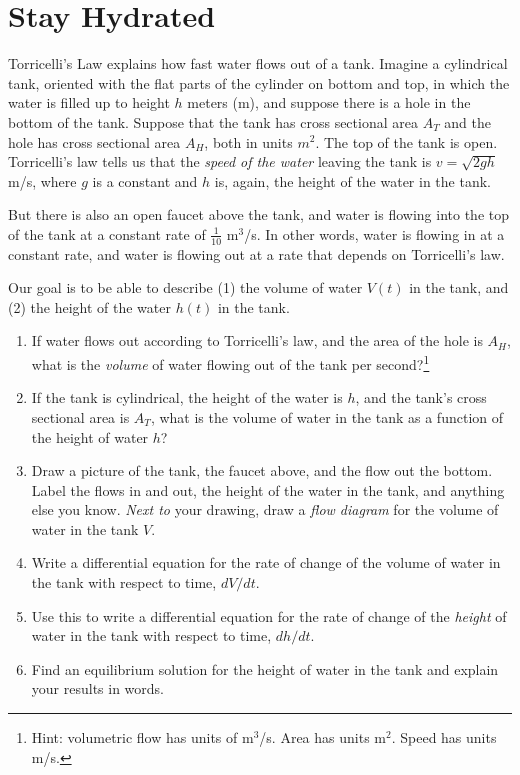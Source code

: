 \documentclass[11pt,onecolumn,superscriptaddress,notitlepage]{article}
\begin{document}
\section*{Stay Hydrated} 
Torricelli's Law explains how fast water flows out of a tank. Imagine a cylindrical tank, oriented with the flat parts of the cylinder on bottom and top, in which the water is filled up to height $h$ meters (m), and suppose there is a hole in the bottom of the tank. Suppose that the tank has cross sectional area $A_T$ and the hole has cross sectional area $A_H$, both in units $m^2$. The top of the tank is open. Torricelli's law tells us that the {\it speed of the water} leaving the tank is $v = \sqrt{2 g h}$ m/s, where $g$ is a constant and $h$ is, again, the height of the water in the tank.  

But there is also an open faucet above the tank, and water is flowing into the top of the tank at a constant rate of $\frac{1}{10}$ m$^3$/s. In other words, water is flowing in at a constant rate, and water is flowing out at a rate that depends on Torricelli's law. 

Our goal is to be able to describe (1) the volume of water $V(t)$ in the tank, and (2) the height of the water $h(t)$ in the tank. 

\begin{enumerate}[resume]
	\item If water flows out according to Torricelli's law, and the area of the hole is $A_H$, what is the {\it volume} of water flowing out of the tank per second?\footnote{Hint: volumetric flow has units of m$^3$/s. Area has units m$^2$. Speed has units m/s.}
	\item If the tank is cylindrical, the height of the water is $h$, and the tank's cross sectional area is $A_T$, what is the volume of water in the tank as a function of the height of water $h$?
	\item Draw a picture of the tank, the faucet above, and the flow out the bottom. Label the flows in and out, the height of the water in the tank, and anything else you know.  {\it Next to} your drawing, draw a {\it flow diagram} for the volume of water in the tank $V$.  
	\item Write a differential equation for the rate of change of the volume of water in the tank with respect to time, $dV/dt$.
	\item Use this to write a differential equation for the rate of change of the {\it height} of water in the tank with respect to time, $dh/dt$. 
	\item Find an equilibrium solution for the height of water in the tank and explain your results in words.
\end{enumerate}
\end{document}
